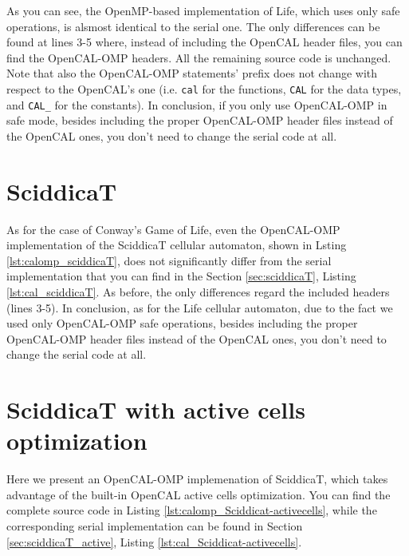 As you can see, the OpenMP-based implementation of Life, which uses
only safe operations, is alsmost identical to the serial one. The only
differences can be found at lines 3-5 where, instead of including the
OpenCAL header files, you can find the OpenCAL-OMP headers. All the
remaining source code is unchanged. Note that also the OpenCAL-OMP
statements' prefix does not change with respect to the OpenCAL's one
(i.e. \verb'cal' for the functions, \verb'CAL' for the data types, and
\verb'CAL_' for the constants). In conclusion, if you only use
OpenCAL-OMP in safe mode, besides including the proper OpenCAL-OMP
header files instead of the OpenCAL ones, you don't need to change the
serial code at all.

\section{SciddicaT}

As for the case of Conway's Game of Life, even the OpenCAL-OMP
implementation of the SciddicaT cellular automaton, shown in Lsting
\ref{lst:calomp_sciddicaT}, does not significantly differ from the
serial implementation that you can find in the Section
\ref{sec:sciddicaT}, Listing \ref{lst:cal_sciddicaT}. As before, the
only differences regard the included headers (lines 3-5). In
conclusion, as for the Life cellular automaton, due to the fact we
used only OpenCAL-OMP safe operations, besides including the proper
OpenCAL-OMP header files instead of the OpenCAL ones, you don't need
to change the serial code at all.



\section{SciddicaT with active cells optimization}
Here we present an OpenCAL-OMP implemenation of SciddicaT, which takes
advantage of the built-in OpenCAL active cells optimization. You can
find the complete source code in Listing
\ref{lst:calomp_Sciddicat-activecells}, while the corresponding serial
implementation can be found in Section
\ref{sec:sciddicaT_active}, Listing
\ref{lst:cal_Sciddicat-activecells}.




